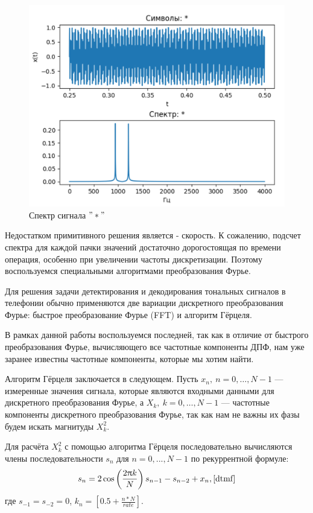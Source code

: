 \begin{figure}[ht] 
	\center
	\includegraphics [scale=0.6] {my_folder/images/step-4}
	\caption{Спектр сигнала $"*"$} 
	\label{fig:step-4}
	\end{figure}

Недостатком примитивного решения является - скорость. К сожалению, подсчет спектра для каждой пачки значений достаточно дорогостоящая по времени операция, особенно при увеличении частоты дискретизации. Поэтому воспользуемся специальными алгоритмами преобразования Фурье.

Для решения задачи детектирования и декодирования тональных сигналов в телефонии обычно применяются две вариации дискретного преобразования Фурье: быстрое преобразование Фурье (FFT) и алгоритм Гёрцеля. 

В рамках данной работы воспользуемся последней, так как в отличие от быстрого преобразования Фурье, вычисляющего все частотные компоненты ДПФ, нам уже заранее известны частотные компоненты, которые мы хотим найти.

Алгоритм Гёрцеля заключается в следующем. Пусть $x_{n},\ n=0,\dots ,N-1$ — измеренные значения сигнала, которые являются входными данными для дискретного преобразования Фурье, а $X_{k},\ k=0,\dots ,N-1$ — частотные компоненты дискретного преобразования Фурье, так как нам не важны их фазы будем искать магнитуды $X_{k}^{2}$.

Для расчёта $X_{k}^{2}$ с помощью алгоритма Гёрцеля последовательно вычисляются члены последовательности $s_n$ для $n=0, ..., N-1$ по рекуррентной формуле:
\begin{equation}
 	s_{n}=2\cos \left({\frac {2\pi k}{N}}\right)s_{n-1}-s_{n-2}+x_{n}, \cite{dtmf}
\end{equation}	
где $s_{-1}=s_{-2}=0$, $k_n = [0.5 + \frac{n * N}{rate}]$.

